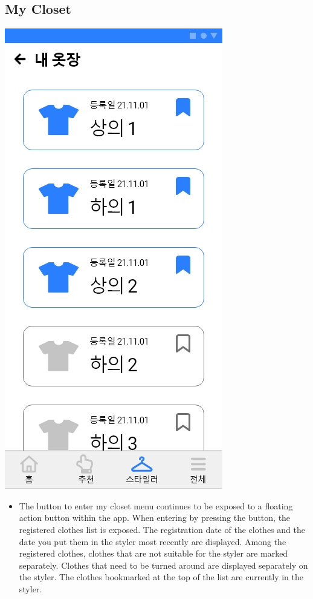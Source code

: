 \documentclass[conference]{IEEEtran}
\begin{document}
\subsection{My Closet \\}
\centerline{\includegraphics[scale=0.32]{10. 내 옷장.jpg}}
    \begin{itemize}
    \item[] The button to enter my closet menu continues to be exposed to a floating action button within the app. When entering by pressing the button, the registered clothes list is exposed. The registration date of the clothes and the date you put them in the styler most recently are displayed. Among the registered clothes, clothes that are not suitable for the styler are marked separately. Clothes that need to be turned around are displayed separately on the styler. The clothes bookmarked at the top of the list are currently in the styler.
\end{itemize}
\end{document}
